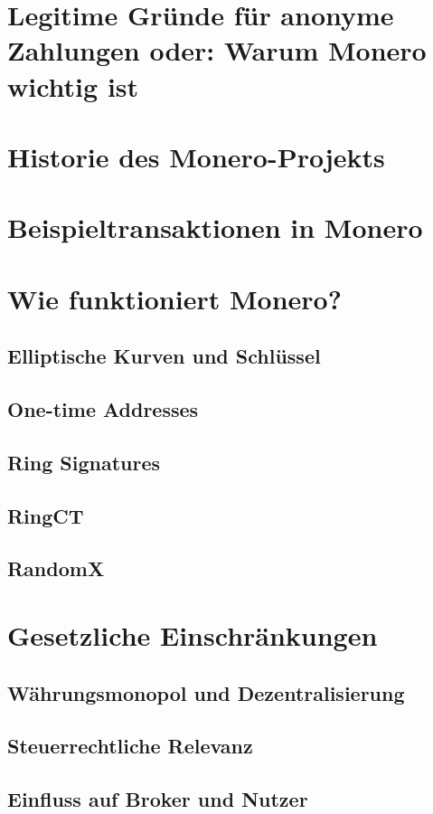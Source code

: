 \chapter{Legitime Gründe für anonyme Zahlungen oder: Warum Monero wichtig ist} \label {reasons}

\chapter{Historie des Monero-Projekts}

\chapter{Beispieltransaktionen in Monero}

\chapter{Wie funktioniert Monero?}

\section{Elliptische Kurven und Schlüssel}

\section{One-time Addresses}

\section{Ring Signatures}

\section{RingCT}

\section{RandomX}

\chapter{Gesetzliche Einschränkungen} \label{legal}

\section{Währungsmonopol und Dezentralisierung}

\section{Steuerrechtliche Relevanz}

\section{Einfluss auf Broker und Nutzer}